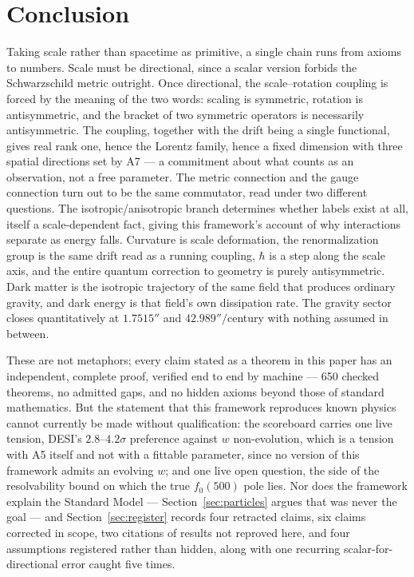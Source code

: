 \documentclass[aps,prd,twocolumn,superscriptaddress,nofootinbib]{revtex4-2}
\begin{document}
\section{Conclusion}\label{sec:concl}

Taking scale rather than spacetime as primitive, a single chain runs from
axioms to numbers. Scale must be directional, since a scalar version
forbids the Schwarzschild metric outright. Once directional, the
scale–rotation coupling is forced by the meaning of the two words:
scaling is symmetric, rotation is antisymmetric, and the bracket of two
symmetric operators is necessarily antisymmetric. The coupling, together
with the drift being a single functional, gives real rank one, hence the
Lorentz family, hence a fixed dimension with three spatial directions set
by A7 — a commitment about what counts as an observation, not a free
parameter. The metric connection and the gauge connection turn out to be
the same commutator, read under two different questions. The
isotropic/anisotropic branch determines whether labels exist at all,
itself a scale-dependent fact, giving this framework's account of why
interactions separate as energy falls. Curvature is scale deformation,
the renormalization group is the same drift read as a running coupling,
$\hbar$ is a step along the scale axis, and the entire quantum correction
to geometry is purely antisymmetric. Dark matter is the isotropic
trajectory of the same field that produces ordinary gravity, and dark
energy is that field's own dissipation rate. The gravity sector closes
quantitatively at $1.7515''$ and $42.989''/$century with nothing assumed
in between.

These are not metaphors; every claim stated as a theorem in this paper
has an independent, complete proof, verified end to end by machine — 650
checked theorems, no admitted gaps, and no hidden axioms beyond those of
standard mathematics. But the statement that this framework reproduces
known physics cannot currently be made without qualification: the
scoreboard carries one live tension, DESI's $2.8$–$4.2\sigma$ preference
against $w$ non-evolution, which is a tension with A5 itself and not with
a fittable parameter, since no version of this framework admits an
evolving $w$; and one live open question, the side of the resolvability
bound on which the true $f_0(500)$ pole lies. Nor does the framework
explain the Standard Model — Section~\ref{sec:particles} argues that was
never the goal — and Section~\ref{sec:register} records four retracted
claims, six claims corrected in scope, two citations of results not
reproved here, and four assumptions registered rather than hidden, along
with one recurring scalar-for-directional error caught five times.
\end{document}
